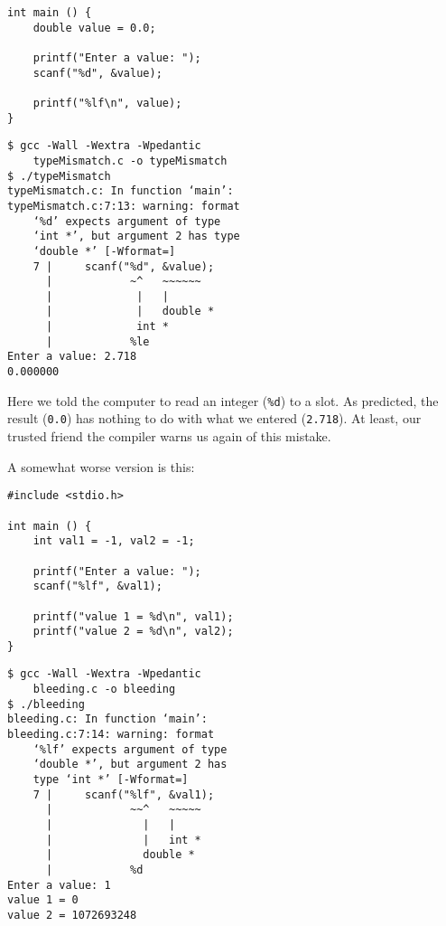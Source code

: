 {\begin{tcbraster}[raster columns=2,
                  raster equal height,
                  nobeforeafter,
                  raster column skip=0.2cm]
\begin{warnbox}[typeMismatch.c, leftupper=7mm]
\begin{verbatim}
int main () {
    double value = 0.0;
    
    printf("Enter a value: "); 
    scanf("%d", &value);
    
    printf("%lf\n", value);
}
\end{verbatim}
\end{warnbox}
%
\begin{cmdbox}
\begin{verbatim}
$ gcc -Wall -Wextra -Wpedantic 
    typeMismatch.c -o typeMismatch
$ ./typeMismatch
typeMismatch.c: In function ‘main’:
typeMismatch.c:7:13: warning: format 
    ‘%d’ expects argument of type 
    ‘int *’, but argument 2 has type 
    ‘double *’ [-Wformat=]
    7 |     scanf("%d", &value);
      |            ~^   ~~~~~~
      |             |   |
      |             |   double *
      |             int *
      |            %le
Enter a value: 2.718 
0.000000
\end{verbatim}
\end{cmdbox}
\end{tcbraster}
Here we told the computer to read an integer (\texttt{\%d}) to a  slot. As predicted, the result (\texttt{0.0}) has nothing to do with what we entered (\texttt{2.718}). At least, our trusted friend the compiler warns us again of this mistake.

A somewhat worse version is this:
\begin{tcbraster}[raster columns=2,
                  raster equal height,
                  nobeforeafter,
                  raster column skip=0.2cm]
\begin{warnbox}[bleeding.c, leftupper=7mm]
\begin{verbatim}
#include <stdio.h>

int main () {
    int val1 = -1, val2 = -1;

    printf("Enter a value: ");
    scanf("%lf", &val1);

    printf("value 1 = %d\n", val1);
    printf("value 2 = %d\n", val2);
}
\end{verbatim}
\end{warnbox}
%
\begin{cmdbox}
\begin{verbatim}
$ gcc -Wall -Wextra -Wpedantic 
    bleeding.c -o bleeding
$ ./bleeding
bleeding.c: In function ‘main’:
bleeding.c:7:14: warning: format 
    ‘%lf’ expects argument of type 
    ‘double *’, but argument 2 has 
    type ‘int *’ [-Wformat=]
    7 |     scanf("%lf", &val1);
      |            ~~^   ~~~~~
      |              |   |
      |              |   int *
      |              double *
      |            %d
Enter a value: 1
value 1 = 0
value 2 = 1072693248
\end{verbatim}
\end{cmdbox}
\end{tcbraster}

}
